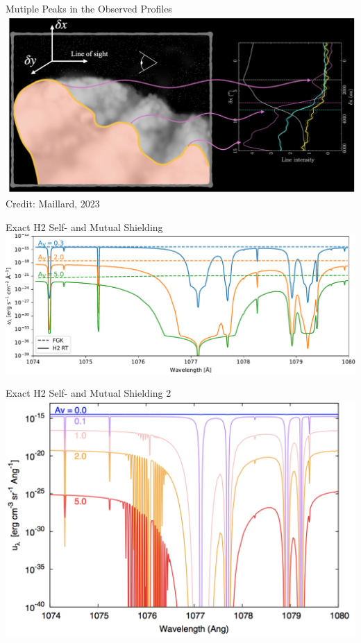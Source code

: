 \documentclass[10pt,dvipsnames,hyperref={colorlinks=false}]{beamer}
\begin{document}
\begin{frame}{Mutiple Peaks in the Observed Profiles}
    \includegraphics[width=\textwidth,keepaspectratio]{multiple_fronts.png}
    \hfill\scriptsize Credit: Maillard, 2023
\end{frame}

\begin{frame}{Exact H2 Self- and Mutual Shielding}
    \centering
    \includegraphics[width=.8\textwidth,keepaspectratio]{spectra_fgkh2_1.pdf}
\end{frame}

\begin{frame}{Exact H2 Self- and Mutual Shielding 2}
    \centering
    \includegraphics[width=.88\textwidth,keepaspectratio]{localenergydensity.png}
\end{frame}
\end{document}
